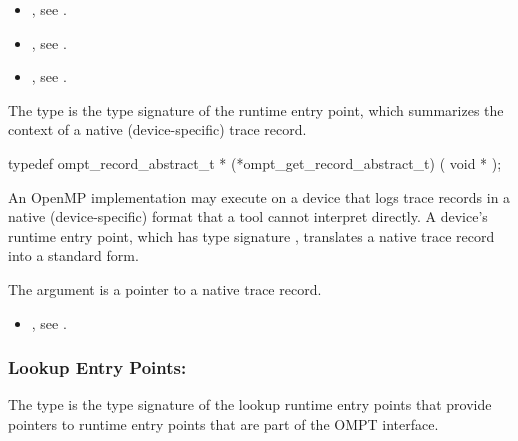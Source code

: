 \crossreferences
\begin{itemize}
\item {}, see .

\item {}, see .

\item {}, see .
\end{itemize}



\label{sec:ompt_get_record_abstract_t}

\summary
The  type is the type signature of the 
 runtime entry point, which summarizes the 
context of a native (device-specific) trace record.

\format
\begin{ccppspecific}
\begin{omptOther}
typedef ompt_record_abstract_t *
(*ompt_get_record_abstract_t) (
  void *
);
\end{omptOther}
\end{ccppspecific}

\descr
An OpenMP implementation may execute on a device that logs trace 
records in a native (device-specific) format that a tool cannot
interpret directly. A device's  runtime 
entry point, which has type signature , 
translates a native trace record into a standard form.

\argdesc
The  argument is a pointer to a native trace record.

\crossreferences
\begin{itemize}
\item {}, see .
\end{itemize}



\subsubsection{Lookup Entry Points: }
\label{sec:ompt_function_lookup_t}
\label{sec:ompt_function_lookup}

\summary
The  type is the type signature of the 
lookup runtime entry points that provide pointers to runtime entry 
points that are part of the OMPT interface.

